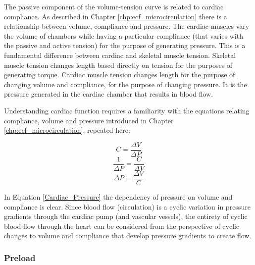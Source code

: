 The passive component of the volume-tension curve is related to cardiac compliance. As described in Chapter \ref{chp:ecf_microcirculation} there is a relationship between volume, compliance and pressure. The cardiac muscles vary the volume of chambers while having a particular compliance (that varies with the passive and active tension) for the purpose of generating pressure. This is a fundamental difference between cardiac and skeletal muscle tension. Skeletal muscle tension changes length based directly on tension for the purposes of generating torque. Cardiac muscle tension changes length for the purpose of changing volume and compliance, for the purpose of changing pressure. It is the pressure generated in the cardiac chamber that results in blood flow.

Understanding cardiac function requires a familiarity with the equations relating compliance, volume and pressure introduced in Chapter \ref{chp:ecf_microcirculation}, repeated here:


\begin{equation}
    C = \frac{\Delta V}{\Delta P}
    \label{Cardiac_Compliance}
\end{equation}
\begin{equation}
    \frac{1}{\Delta P} = \frac{C}{\Delta V}
    \label{Cardiac_InversePressure}
\end{equation}
\begin{equation}
    \Delta P = \frac{\Delta V}{C}
    \label{Cardiac_Pressure}
\end{equation}

In Equation \ref{Cardiac_Pressure} the dependency of pressure on volume and compliance is clear. Since blood flow (circulation) is a cyclic variation in pressure gradients through the cardiac pump (and vascular vessels), the entirety of cyclic blood flow through the heart can be considered from the perspective of cyclic changes to volume and compliance that develop pressure gradients to create flow.

\subsubsection{Preload}

